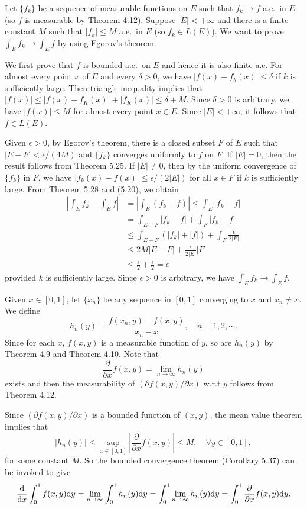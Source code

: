 \begin{exercise}{5.5}
  Let $\{f_k\}$ be a sequence of measurable functions on $E$ such that
  $f_k\to f$ a.e.\ in $E$ (so $f$ is measurable by Theorem 4.12).
  Suppose $|E|<+\infty$ and there is a finite constant $M$
  such that $|f_k|\leq M$ a.e.\ in $E$ (so $f_k\in L(E)$).
  We want to prove $\int_Ef_k\to \int_E f$ by using Egorov's theorem.

  We first prove that $f$ is bounded a.e.\ on $E$ and hence it is also finite a.e.
  For almost every point $x$ of $E$ and every $\delta>0$,
  we have $|f(x)-f_k(x)|\leq\delta$ if $k$ is sufficiently large.
  Then triangle inequality implies that $|f(x)|\leq|f(x)-f_K(x)|+|f_K(x)|\leq \delta+M$.
  Since $\delta>0$ is arbitrary,
  we have $|f(x)|\leq M$ for almost every point $x\in E$.
  Since $|E|<+\infty$, it follows that $f\in L(E)$.

  Given $\epsilon>0$, by Egorov's theorem,
  there is a closed subset $F$ of $E$ such that
  $|E-F|<\epsilon/(4M)$ and $\{f_k\}$ converges uniformly to $f$ on $F$.
  If $|E|=0$, then the result follows from Theorem 5.25.
  If $|E|\neq 0$, then by the uniform convergence of $\{f_k\}$ in $F$,
  we have $|f_k(x)-f(x)|\leq \epsilon/(2|E|)$ for all $x\in F$ if $k$ is sufficiently large.
  From Theorem 5.28 and (5.20), we obtain
  \begin{equation*}
    \begin{aligned}
      \left|\int_E f_k-\int_Ef\right|&=	\left|\int_E (f_k-f)\right|\leq \int_E|f_k-f|\\&=\int_{E-F}|f_k-f|+\int_F|f_k-f|\\&\leq\int_{E-F}(|f_k|+|f|)+\int_F\frac{\epsilon}{2|E|}\\
      &\leq 2M|E-F|+\frac{\epsilon}{2|E|}|F|\\&\leq\frac{\epsilon}{2}+\frac{\epsilon}{2}=\epsilon
    \end{aligned}
  \end{equation*}
  provided $k$ is sufficiently large.
  Since $\epsilon>0$ is arbitrary, we have $\int_Ef_k\to \int_E f$.
\end{exercise}

\begin{exercise}{5.6}
  Given $x\in [0,1]$, let $\{x_n\}$ be any sequence in $[0,1]$ converging to $x$ and $x_n\neq x$.
  We define
  \[h_n(y)=\frac{f(x_n,y)-f(x,y)}{x_n-x},\quad n=1,2,\cdots.\]
  Since for each $x$, $f(x,y)$ is a measurable function of $y$,
  so are $h_n(y)$ by Theorem 4.9 and Theorem 4.10.
  Note that
  \[\frac{\partial}{\partial x}f(x,y)=\lim_{n\to\infty}h_n(y)\] exists
  and then the measurability of $(\partial f(x,y)/\partial x)$ w.r.t $y$ follows from Theorem 4.12.

  Since $(\partial f(x,y)/\partial x)$ is a bounded function of $(x,y)$,
  the mean value theorem implies that
  \[|h_n(y)|\leq \sup_{x\in[0,1]}\left|\frac{\partial}{\partial x}f(x,y)\right|\leq M, \quad\forall y\in[0,1],\]
  for some constant $M$.
  So the bounded convergence theorem (Corollary 5.37) can be invoked to give
  \[\frac{\mathrm{d}}{\mathrm{d} x}\int_0^1f(x,y)\mathrm{d} y=\lim_{n\to\infty}\int_0^1h_n(y)\mathrm{d} y=\int_0^1\lim_{n\to\infty}h_n(y)\mathrm{d} y=\int_0^1\frac{\partial}{\partial x}f(x,y)\mathrm{d} y.\]
\end{exercise}

